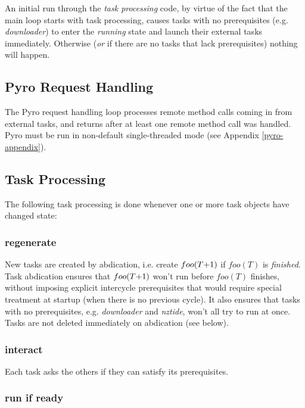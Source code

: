 \documentclass[11pt,a4paper]{report}
\begin{document}
An initial run through the {\em task processing} code, by virtue of the
fact that the main loop starts with task processing, causes tasks with
no prerequisites (e.g. {\em downloader}) to enter the {\em running}
state and launch their external tasks immediately. Otherwise ({\em or}
if there are no tasks that lack prerequisites) nothing will happen.


\subsection{Pyro Request Handling}

The Pyro request handling loop processes remote method calls coming in
from external tasks, and returns after at least one remote method call
was handled. Pyro must be run in non-default single-threaded mode (see
Appendix \ref{pyro-appendix}).


\subsection{Task Processing}

The following task processing is done whenever one or more task objects
have changed state: 

\subsubsection{regenerate}

New tasks are created by abdication, i.e. create $foo(T\negmedspace
+\negmedspace 1)$ if $foo(T)$ is {\em finished}.  Task abdication
ensures that $foo(T\negmedspace +\negmedspace 1)$ won't run before
$foo(T)$ finishes, without imposing explicit intercycle prerequisites
that would require special treatment at startup (when there is no
previous cycle).  It also ensures that tasks with no prerequisites, e.g.
{\em downloader} and {\em nztide}, won't all try to run at once.
Tasks are not deleted immediately on abdication (see below).


\subsubsection{interact} 

Each task asks the others if they can satisfy its prerequisites. 

\subsubsection{run if ready}
\end{document}
